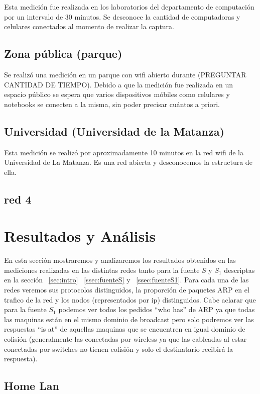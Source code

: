 \documentclass[final,inline,narroweqnarray,a4paper]{ieee}
\begin{document}
Esta medición fue realizada en los laboratorios del departamento de computación por un intervalo de 30 minutos. Se desconoce la cantidad de computadoras y celulares conectados al momento de realizar la captura.

\subsection{Zona pública (parque)}
Se realizó una medición en un parque con wifi abierto durante (PREGUNTAR CANTIDAD DE TIEMPO). Debido a que la medición fue realizada en un espacio público se espera que varios dispositivos móbiles como celulares y notebooks se conecten a la misma, sin poder precisar cuántos a priori.

\subsection{Universidad (Universidad de la Matanza)}
Esta medición se realizó por aproximadamente 10 minutos en la red wifi de la Universidad de La Matanza. Es una red abierta y desconocemos la estructura de ella.

\subsection{red 4}

\section{Resultados y Análisis}
En esta sección mostraremos y analizaremos los resultados obtenidos en las mediciones realizadas en las distintas redes tanto para la fuente $S$ y $S_1$ descriptas en la sección ~\ref{sec:intro} ~\ref{ssec:fuenteS} y ~\ref{ssec:fuenteS1}. Para cada una de las redes veremos sus protocolos distinguidos, la proporción de paquetes ARP en el trafico de la red y los nodos (representados por ip) distinguidos. Cabe aclarar que para la fuente $S_1$ podemos ver todos los pedidos ``who has'' de ARP ya que todas las maquinas están en el mismo dominio de broadcast pero solo podremos ver las respuestas ``is at'' de aquellas maquinas que se encuentren en igual dominio de colisión (generalmente las conectadas por wireless ya que las cableadas al estar conectadas por switches no tienen colisión y solo el destinatario recibirá la respuesta). 


\subsection{Home Lan}
\end{document}
